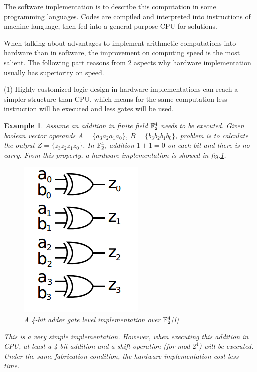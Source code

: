 \documentclass[11pt,twoside, onecolumn]{IEEEtran}
\newtheorem{Example}{Example}[section]
\begin{document}
The software implementation is to describe this computation in some programming languages.
Codes are compiled and interpreted into instructions of machine language,
then fed into a general-purpose CPU for solutions.

When talking about advantages to implement arithmetic computations into hardware than in software,
the improvement on computing speed is the most salient. The following part reasons from 2 aspects
why hardware implementation usually has superiority on speed.

(1) Highly customized logic design in hardware implementations can reach a simpler structure
than CPU, which means for the same computation less instruction will be executed and less
gates will be used.

\begin{Example}
\label{ex:4adder}
Assume an addition in finite field ${\mathbb{F}}_2^4$ needs to be executed. Given boolean vector operands
$A = \{a_3a_2a_1a_0\}$, $B = \{b_3b_2b_1b_0\}$, problem is to calculate the output 
$Z = \{z_3z_2z_1z_0\}$. In ${\mathbb{F}}_2^4$, addition $1 + 1 = 0$ on each bit and there is no carry.
From this property, a hardware implementation is showed in fig.\ref{fig:4adder}.

\begin{figure}[hbt]
	\begin{center}
	\includegraphics[scale=0.4]{4adder.png}
	\end{center}
	\caption{A 4-bit adder gate level implementation over ${\mathbb{F}}_2^4$[1]}
	\label{fig:4adder}
\end{figure}

This is a very simple implementation. However, when executing this addition in CPU,
at least a 4-bit addition and a shift operation (for mod $2^4$) will be executed.
Under the same fabrication condition, the hardware implementation cost less time.
\end{Example}
\end{document}

